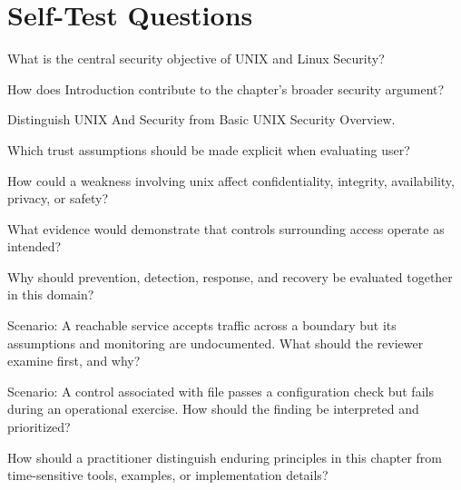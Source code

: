 \documentclass[11pt,letterpaper]{article}
\begin{document}
\section*{Self-Test Questions}
\begin{CornellRecallList}
\item What is the central security objective of UNIX and Linux Security?
\item How does Introduction contribute to the chapter's broader security argument?
\item Distinguish UNIX And Security from Basic UNIX Security Overview.
\item Which trust assumptions should be made explicit when evaluating user?
\item How could a weakness involving unix affect confidentiality, integrity, availability, privacy, or safety?
\item What evidence would demonstrate that controls surrounding access operate as intended?
\item Why should prevention, detection, response, and recovery be evaluated together in this domain?
\item Scenario: A reachable service accepts traffic across a boundary but its assumptions and monitoring are undocumented. What should the reviewer examine first, and why?
\item Scenario: A control associated with file passes a configuration check but fails during an operational exercise. How should the finding be interpreted and prioritized?
\item How should a practitioner distinguish enduring principles in this chapter from time-sensitive tools, examples, or implementation details?
\end{CornellRecallList}
\end{document}
